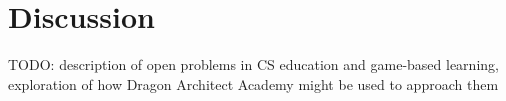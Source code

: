 \documentclass{sig-alternate}
\newcommand{\TODO}[1]{{\color{red} TODO: #1}}
\newcommand{\gametitle}{{\color{RoyalPurple} Dragon Architect Academy}}
\begin{document}
\section{Discussion}
\TODO{description of open problems in CS education and game-based learning, exploration of how \gametitle{} might be used to approach them}



 
\end{document}
